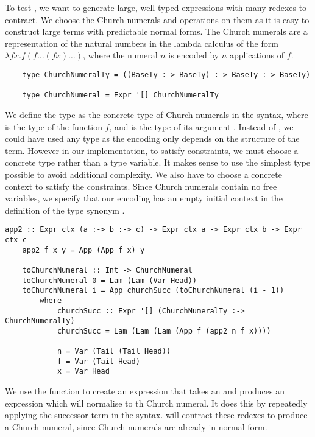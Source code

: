 To test , we want to generate large, well-typed expressions with many redexes to contract. We choose the Church numerals and operations on them as it is easy to construct large terms with predictable normal forms. The Church numerals are a representation of the natural numbers in the lambda calculus of the form $\lambda f x . f (f \dots (f x) \dots)$, where the numeral $n$ is encoded by $n$ applications of $f$. \cite{churchEncodings}  

\begin{lstlisting}
    type ChurchNumeralTy = ((BaseTy :-> BaseTy) :-> BaseTy :-> BaseTy)

    type ChurchNumeral = Expr '[] ChurchNumeralTy
\end{lstlisting}

We define the type  as the concrete type of Church numerals in the  syntax, where  is the type of the function $f$, and  is the type of its argument . Instead of , we could have used any type as the encoding only depends on the structure of the term. However in our implementation, to satisfy  constraints, we must choose a concrete type rather than a type variable. It makes sense to use the simplest type possible to avoid additional complexity. We also have to choose a concrete context to satisfy the  constraints. Since Church numerals contain no free variables, we specify that our encoding has an empty initial context in the definition of the type synonym . 

\begin{lstlisting}[morekeywords={a, b, c}]
    app2 :: Expr ctx (a :-> b :-> c) -> Expr ctx a -> Expr ctx b -> Expr ctx c
    app2 f x y = App (App f x) y 

    toChurchNumeral :: Int -> ChurchNumeral
    toChurchNumeral 0 = Lam (Lam (Var Head))
    toChurchNumeral i = App churchSucc (toChurchNumeral (i - 1)) 
        where
            churchSucc :: Expr '[] (ChurchNumeralTy :-> ChurchNumeralTy)
            churchSucc = Lam (Lam (Lam (App f (app2 n f x))))

            n = Var (Tail (Tail Head))
            f = Var (Tail Head)
            x = Var Head
\end{lstlisting}

We use the  function to create an expression that takes an   and produces an expression which will normalise to th Church numeral. It does this by repeatedly applying the successor term  in the syntax.  will contract these redexes to produce a Church numeral, since Church numerals are already in normal form. 

